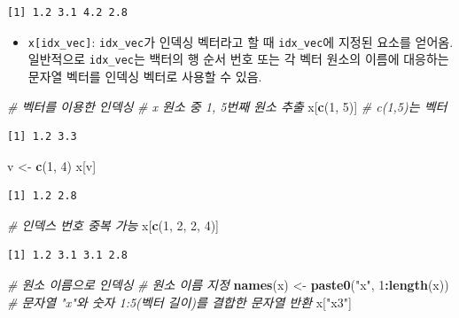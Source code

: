 \documentclass[
  11pt,
]{krantz}
\newenvironment{Shaded}{\begin{snugshade}}{\end{snugshade}}
\newcommand{\CommentTok}[1]{\textcolor[rgb]{0.37,0.37,0.37}{\textit{#1}}}
\newcommand{\DecValTok}[1]{\textcolor[rgb]{0.06,0.06,0.06}{#1}}
\newcommand{\KeywordTok}[1]{\textcolor[rgb]{0.27,0.27,0.27}{\textbf{#1}}}
\newcommand{\NormalTok}[1]{#1}
\newcommand{\OperatorTok}[1]{\textcolor[rgb]{0.43,0.43,0.43}{\textbf{#1}}}
\newcommand{\StringTok}[1]{\textcolor[rgb]{0.5,0.5,0.5}{#1}}
\providecommand{\tightlist}{%
  \setlength{\itemsep}{0pt}\setlength{\parskip}{0pt}}
\begin{document}
\begin{verbatim}
[1] 1.2 3.1 4.2 2.8
\end{verbatim}

\normalsize

\begin{itemize}
\tightlist
\item
  \texttt{x{[}idx\_vec{]}}: \texttt{idx\_vec}가 인덱싱 벡터라고 할 때 \texttt{idx\_vec}에 지정된 요소를 얻어옴. 일반적으로 \texttt{idx\_vec}는 백터의 행 순서 번호 또는 각 벡터 원소의 이름에 대응하는 문자열 벡터를 인덱싱 벡터로 사용할 수 있음.
\end{itemize}

\footnotesize

\begin{Shaded}
\begin{Highlighting}[]
\CommentTok{# 벡터를 이용한 인덱싱}
\CommentTok{# x 원소 중 1, 5번째 원소 추출}
\NormalTok{x[}\KeywordTok{c}\NormalTok{(}\DecValTok{1}\NormalTok{, }\DecValTok{5}\NormalTok{)] }\CommentTok{# c(1,5)는 벡터}
\end{Highlighting}
\end{Shaded}

\begin{verbatim}
[1] 1.2 3.3
\end{verbatim}

\begin{Shaded}
\begin{Highlighting}[]
\NormalTok{v <-}\StringTok{ }\KeywordTok{c}\NormalTok{(}\DecValTok{1}\NormalTok{, }\DecValTok{4}\NormalTok{)}
\NormalTok{x[v]}
\end{Highlighting}
\end{Shaded}

\begin{verbatim}
[1] 1.2 2.8
\end{verbatim}

\begin{Shaded}
\begin{Highlighting}[]
\CommentTok{# 인덱스 번호 중복 가능}
\NormalTok{x[}\KeywordTok{c}\NormalTok{(}\DecValTok{1}\NormalTok{, }\DecValTok{2}\NormalTok{, }\DecValTok{2}\NormalTok{, }\DecValTok{4}\NormalTok{)]}
\end{Highlighting}
\end{Shaded}

\begin{verbatim}
[1] 1.2 3.1 3.1 2.8
\end{verbatim}

\begin{Shaded}
\begin{Highlighting}[]
\CommentTok{# 원소 이름으로 인덱싱}
\CommentTok{# 원소 이름 지정}
\KeywordTok{names}\NormalTok{(x) <-}\StringTok{ }\KeywordTok{paste0}\NormalTok{(}\StringTok{"x"}\NormalTok{, }\DecValTok{1}\OperatorTok{:}\KeywordTok{length}\NormalTok{(x)) }\CommentTok{# 문자열 "x"와 숫자 1:5(벡터 길이)를 결합한 문자열 반환}
\NormalTok{x[}\StringTok{"x3"}\NormalTok{]}
\end{Highlighting}
\end{Shaded}
\end{document}

